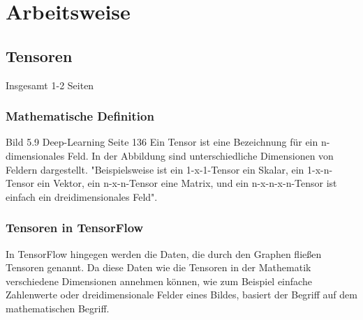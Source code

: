 \chapter{Arbeitsweise}
\label{chap:arbeitsweise}
\section{Tensoren}
\label{sec:tensoren}
\printsubchapterauthor{\authorNiklas}
Insgesamt 1-2 Seiten

\subsection{Mathematische Definition}
\label{sec:mathematischeDefinition}
Bild 5.9 Deep-Learning Seite 136
Ein Tensor ist eine Bezeichnung für ein n-dimensionales Feld. In der Abbildung sind unterschiedliche Dimensionen von Feldern dargestellt. "Beispielsweise ist ein 1-x-1-Tensor ein Skalar, ein 1-x-n-Tensor ein Vektor, ein n-x-n-Tensor eine Matrix, und ein n-x-n-x-n-Tensor ist einfach ein dreidimensionales Feld"\citep{Einfuehrung}.

\subsection{Tensoren in TensorFlow}
\label{sec:tensorenInTensorflow}
In TensorFlow hingegen werden die Daten, die durch den Graphen fließen Tensoren genannt. Da diese Daten wie die Tensoren in der Mathematik verschiedene Dimensionen annehmen können, wie zum Beispiel einfache Zahlenwerte oder dreidimensionale Felder eines Bildes, basiert der Begriff auf dem mathematischen Begriff. \\

